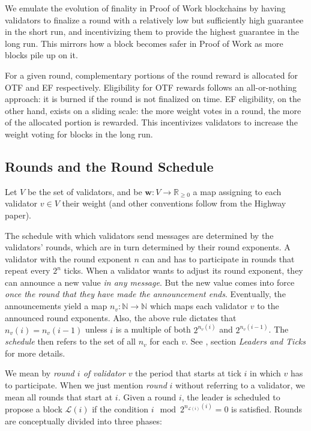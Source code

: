 We emulate the evolution of finality in Proof of Work blockchains by having validators to finalize a round with a relatively low but sufficiently high guarantee in the short run, and incentivizing them to provide the highest guarantee in the long run. This mirrors how a block becomes safer in Proof of Work as more blocks pile up on it.

For a given round, complementary portions of the round reward is allocated for OTF and EF respectively. Eligibility for OTF rewards follows an all-or-nothing approach: it is burned if the round is not finalized on time. EF eligibility, on the other hand, exists on a sliding scale: the more weight votes in a round, the more of the allocated portion is rewarded. This incentivizes validators to increase the weight voting for blocks in the long run.

\subsection{Rounds and the Round Schedule}
\label{sec:schedule}

Let $V$ be the set of validators, and be $\boldsymbol{w}:V\to \mathbb{R}_{\geq 0}$ a map assigning to each validator $v\in V$ their weight (and other conventions follow from the Highway paper).

The schedule with which validators send messages are determined by the validators' rounds, which are in turn determined by their round exponents. A validator with the round exponent $n$ can and has to participate in rounds that repeat every $2^n$ ticks. When a validator wants to adjust its round exponent, they can announce a new value \emph{in any message}. But the new value comes into force \emph{once the round that they have made the announcement ends}. Eventually, the announcements yield a map $n_v: \mathbb{N}\to \mathbb{N}$ which maps each validator $v$ to the announced round exponents. Also, the above rule dictates that $n_v(i)=n_v(i-1)$ unless $i$ is a multiple of both $2^{n_v(i)}$ and $2^{n_v(i-1)}$. The \emph{schedule} then refers to the set of all $n_v$ for each $v$. See \cite{kane2019casperlabs}, section \emph{Leaders and Ticks} for more details.

We mean by \emph{round $i$ of validator $v$} the period that starts at tick $i$ in which $v$ has to participate. When we just mention \emph{round} $i$ without referring to a validator, we mean all rounds that start at $i$. Given a round $i$, the leader is scheduled to propose a block $\mathcal{L}(i)$ if the condition $i\mod 2^{n_{\mathcal{L}(i)}(i)}=0$ is satisfied. Rounds are conceptually divided into three phases:

